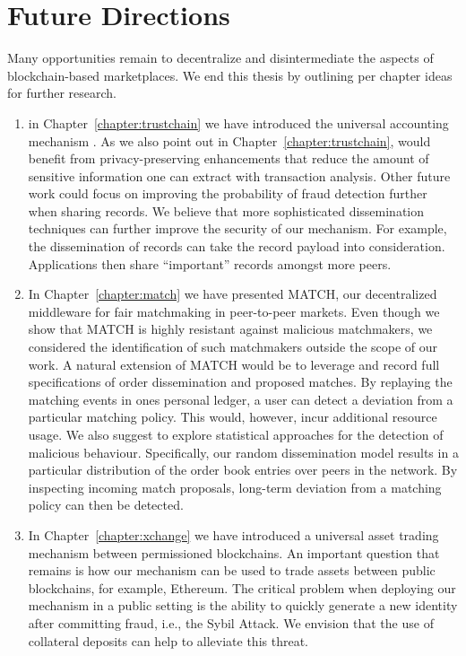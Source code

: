 \section{Future Directions}
Many opportunities remain to decentralize and disintermediate the aspects of blockchain-based marketplaces.
We end this thesis by outlining per chapter ideas for further research.

\begin{enumerate}
	\item in Chapter~\ref{chapter:trustchain} we have introduced the universal accounting mechanism \TrustChain{}.
	As we also point out in Chapter~\ref{chapter:trustchain}, \TrustChain{} would benefit from privacy-preserving enhancements that reduce the amount of sensitive information one can extract with transaction analysis.
	Other future work could focus on improving the probability of fraud detection further when sharing records.
	We believe that more sophisticated dissemination techniques can further improve the security of our mechanism.
	For example, the dissemination of records can take the record payload into consideration.
	Applications then share \enquote{important} records amongst more peers.
	
	\item In Chapter~\ref{chapter:match} we have presented MATCH, our decentralized middleware for fair matchmaking in peer-to-peer markets.
	Even though we show that MATCH is highly resistant against malicious matchmakers, we considered the identification of such matchmakers outside the scope of our work.
	A natural extension of MATCH would be to leverage \TrustChain{} and record full specifications of order dissemination and proposed matches.
	By replaying the matching events in ones personal ledger, a user can detect a deviation from a particular matching policy.
	This would, however, incur additional resource usage.
	We also suggest to explore statistical approaches for the detection of malicious behaviour.
	Specifically, our random dissemination model results in a particular distribution of the order book entries over peers in the network.
	By inspecting incoming match proposals, long-term deviation from a matching policy can then be detected.
	
	\item In Chapter~\ref{chapter:xchange} we have introduced a universal asset trading mechanism between permissioned blockchains.
	An important question that remains is how our mechanism can be used to trade assets between public blockchains, for example, Ethereum.
	The critical problem when deploying our mechanism in a public setting is the ability to quickly generate a new identity after committing fraud, i.e., the Sybil Attack.
	We envision that the use of collateral deposits can help to alleviate this threat.
	

\end{enumerate}
